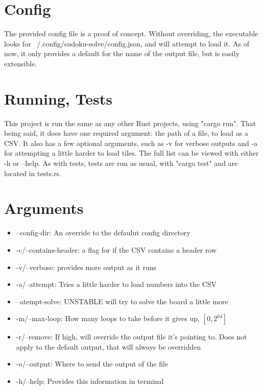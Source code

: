 \documentclass[11pt]{article}
\begin{document}
\section{Config}
The provided config file is a proof of concept. Without overriding, the executable looks for ~/.config/sudoku-solve/config.json, and will attempt to load it. As of now, it only
provides a default for the name of the output file, but is easily extensible.

\section{Running, Tests}
This project is run the same as any other Rust projects, using "cargo run". That being said, it does have one required argument: the path of a file, to load as a CSV.
It also has a few optional arguments, such as -v for verbose outputs and -a for attempting a little harder to load tiles. The full list can be viewed with either -h or --help.
As with tests, tests are run as usual, with "cargo test" and are located in tests.rs.

\section{Arguments}
\begin{itemize}
  \item --config-dir: An override to the defaulut config directory
  \item -c/--contains-header: a flag for if the CSV contains a header row
  \item -v/--verbose: provides more output as it runs
  \item -a/--attempt: Tries a little harder to load numbers into the CSV
  \item --atempt-solve: UNSTABLE will try to solve the board a little more
  \item -m/--max-loop: How many loops to take before it gives up, $[0, 2^{64}]$
  \item -r/--remove: If high, will override the output file it's pointing to. Does not apply to the default output, that will always be overridden
  \item -o/--output: Where to send the output of the file
  \item -h/--help: Provides this information in terminal
\end{itemize}
\end{document}
